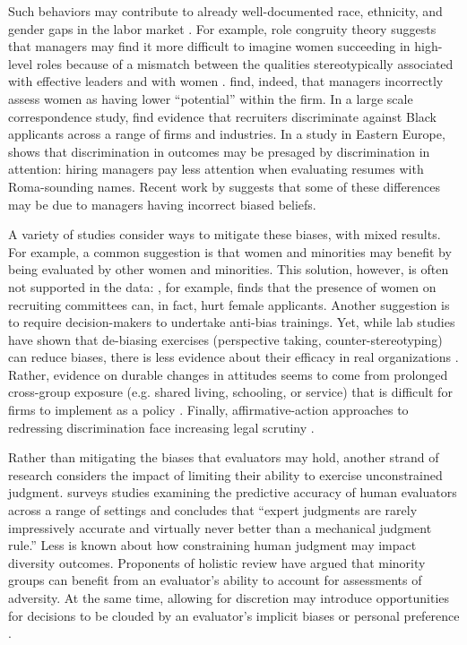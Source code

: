 \documentclass[crop,noquery,editorname,historyrev,nosurname,runningno,sepcount]{RESTUD}
\begin{document}
Such behaviors may contribute to already well-documented race, ethnicity, and gender gaps in the labor market \citep{bertrandduflo, blaukahn, pager}.  For example, role congruity theory suggests that managers may find it more difficult to imagine women succeeding in high-level roles because of a mismatch between the qualities stereotypically associated with effective leaders and with women \citep{eagly2002role}. \citet{bensonlishue2021} find, indeed, that managers incorrectly assess women as having lower ``potential'' within the firm.  In a large scale correspondence study, \citet{klinerosewalters} find evidence that recruiters discriminate against Black applicants across a range of firms and industries.  In a study in Eastern Europe, \citet{bartos} shows that discrimination in outcomes may be presaged by discrimination in attention: hiring managers pay less attention when evaluating resumes with Roma-sounding names.  Recent work by \citet{bohren1} suggests that some of these differences may be due to managers having incorrect biased beliefs. 
 
A variety of studies consider ways to mitigate these biases, with mixed results.  For example, a common suggestion is that women and minorities may benefit by being evaluated by other women and minorities.  This solution, however, is often not supported in the data: 
\citet{baguesev}, for example, finds that the presence of women on recruiting committees can, in fact, hurt female applicants.  Another suggestion is to require decision-makers to undertake anti-bias trainings.  Yet, while lab studies have shown that de-biasing exercises (perspective taking, counter-stereotyping) can reduce biases, there is less evidence about their efficacy in real organizations \citep{paluck}.  Rather, evidence on durable changes in attitudes seems to come from prolonged cross-group exposure (e.g. shared living, schooling, or service) that is difficult for firms to implement as a policy \citep{baguesroth2021, gautamjmp}. Finally, affirmative-action approaches to redressing discrimination face increasing legal scrutiny \citep{SFFA_v_Harvard_2022}.  

Rather than mitigating the biases that evaluators may hold, another strand of research considers the impact of limiting their ability to exercise unconstrained judgment.  \citet{dawesbook} surveys studies examining the predictive accuracy of human evaluators across a range of settings and concludes that ``expert judgments are rarely impressively accurate and virtually never better than a mechanical judgment rule.''   Less is known about how constraining human judgment may impact diversity outcomes.  Proponents of holistic review have argued that minority groups can benefit from an evaluator's ability to account for assessments of adversity.  At the same time, allowing for discretion may introduce opportunities for decisions to be clouded by an evaluator's implicit biases or personal preference \citep{prendergast1993discretion, bertrand2005implicit}. 
\end{document}
